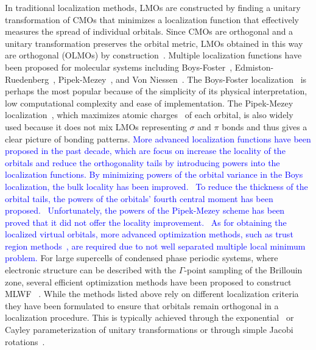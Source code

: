 \documentclass[aps,prl,reprint,amsmath,amssymb]{revtex4-1}
\begin{document}
In traditional localization methods, LMOs are constructed by finding a unitary transformation of CMOs that minimizes a localization function that effectively measures the spread of individual orbitals. 
Since CMOs are orthogonal and a unitary transformation preserves the orbital metric, LMOs obtained in this way are orthogonal (OLMOs) by construction~\cite{weinstein1971localized}.
Multiple localization functions have been proposed for molecular systems including Boys-Foster~\cite{boys1960construction}, Edmiston-Ruedenberg~\cite{bytautas2002electron, bytautas2003split, edmiston1963localized}, Pipek-Mezey~\cite{pipek1989fast}, and Von Niessen~\cite{niessen1972density}. The Boys-Foster localization~\cite{boys1960construction} is perhaps the most popular because of the simplicity of its physical interpretation, low computational complexity and ease of implementation. 
The Pipek-Mezey localization~\cite{pipek1989fast}, which maximizes atomic charges~\cite{mulliken1955electronic, lowdin1950non} of each orbital, is also widely used because it does not mix LMOs representing $\sigma$ and $\pi$ bonds and thus gives a clear picture of bonding patterns. 
\textcolor{blue}{More advanced localization functions have been proposed in the past decade, which are focus on increase the locality of the orbitals and reduce the orthogonality tails by introducing powers into the localization functions.}
\textcolor{blue}{By minimizing powers of the orbital variance in the Boys localization, the bulk locality has been improved.~\cite{jansik2011local}}
\textcolor{blue}{To reduce the thickness of the orbital tails, the powers of the orbitals' fourth central moment has been proposed.~\cite{hoyvik2012orbital}}
\textcolor{blue}{Unfortunately, the powers of the Pipek-Mezey scheme has been proved that it did not offer the locality improvement.~\cite{lehtola2014pipek}}
\textcolor{blue}{As for obtaining the localized virtual orbitals, more advanced optimization methods, such as trust region methods~\cite{jansik2011local, hoyvik2012orbital, hoyvik2012trust, hoyvik2013pipek, hoyvik2017generalising}, are required due to not well separated multiple local minimum problem. }
For large supercells of condensed phase periodic systems, where electronic structure can be described with the $\Gamma$-point sampling of the Brillouin zone, several efficient optimization methods have been proposed to construct MLWF ~\cite{marzari2012maximally, resta1998quantum, resta1999electron, silvestrelli1999maximally, berghold2000general, jonsson2017theory}. 
%
While the methods listed above rely on different localization criteria they have been formulated to ensure that orbitals remain orthogonal in a localization procedure. This is typically achieved through the exponential~\cite{berghold2000general} or Cayley parameterization of unitary transformations or through simple Jacobi rotations~\cite{edmiston1963localized}.
\end{document}
